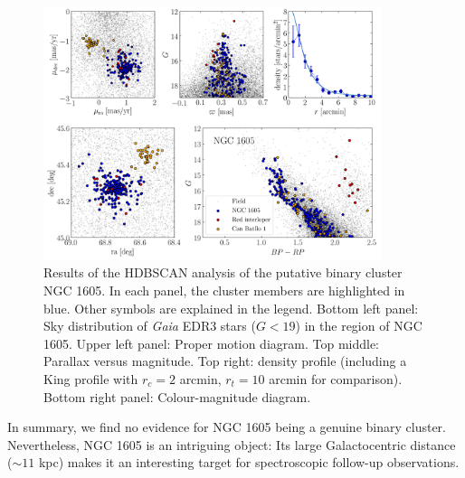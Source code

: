 \documentclass[RNAAS]{aastex631}
\begin{document}
\begin{figure}
\begin{center}
\includegraphics[width=0.88\textwidth,angle=0]{../im/ngc1605_hdbscan_analysis.png}
\caption{Results of the HDBSCAN analysis of the putative binary cluster NGC 1605. In each panel, the cluster members are highlighted in blue. Other symbols are explained in the legend. Bottom left panel: Sky distribution of {\it Gaia} EDR3 stars ($G<19$) in the region of NGC 1605. Upper left panel: Proper motion diagram. Top middle: Parallax versus magnitude. Top right: density profile (including a King profile with $r_c=2$ arcmin, $r_t=10$ arcmin for comparison). Bottom right panel: Colour-magnitude diagram. %
\label{fig:1}}
\end{center}
\end{figure}

In summary, we find no evidence for NGC 1605 being a genuine binary cluster. Nevertheless, NGC 1605 is an intriguing object: Its large Galactocentric distance ($\sim 11$ kpc) makes it an interesting target for spectroscopic follow-up observations. 


{}

\end{document}
